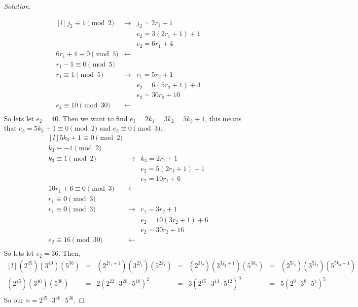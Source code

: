 \documentclass[11pt]{article}
\newenvironment{solution}
  {\renewcommand\qedsymbol{$~$}\begin{proof}[Solution]$ $\par\nobreak\ignorespaces}
  {\end{proof}}
\begin{document}
\begin{solution}
\[\begin{matrix*}[l]
            j_2 \equiv 1 \pmod{2} &\rightarrow & j_2 = 2r_1 + 1 \\
            && e_2 = 3(2r_1+1)+1 \\
            && e_2 = 6r_1 + 4 \\
            6r_1 + 4 \equiv 0 \pmod{5} &\leftarrow& \\
            r_1 - 1 \equiv 0 \pmod{5} && \\
            r_1 \equiv 1 \pmod{5} &\rightarrow& r_1 = 5r_2 + 1 \\
            && e_2 = 6(5r_2 + 1) + 4 \\
            && e_2 = 30r_2 + 10 \\
            e_2 \equiv 10 \pmod{30} &\leftarrow & \\
        \end{matrix*}
    \]
    So lets let $e_2=40$. Then we want to find $e_3 =2k_1 = 3k_2 = 5k_3+1$, this means that $e_3= 5k_3+1 \equiv 0 \pmod{2}$ and $e_3\equiv 0 \pmod{3}$.
    \[
        \begin{matrix*}[l]
            5k_3+1 \equiv 0 \pmod{2} && \\
            k_3 \equiv -1 \pmod{2} && \\
            k_3 \equiv 1 \pmod{2} &\rightarrow & k_3 = 2r_1 + 1 \\
            && e_2 = 5(2r_1+1)+1 \\
            && e_2 = 10r_1 + 6 \\
            10r_1 + 6 \equiv 0 \pmod{3} &\leftarrow& \\
            r_1 \equiv 0 \pmod{3} && \\
            r_1 \equiv 0 \pmod{3} &\rightarrow& r_1 = 3r_2 + 1 \\
            && e_2 = 10(3r_2+1) + 6  \\
            && e_2 = 30r_2 + 16 \\
            e_2 \equiv 16 \pmod{30} &\leftarrow & \\
        \end{matrix*}
    \]
    So lets let $e_2=36$. Then,
    \[
        \begin{matrix*}[l]
            (2^{45})(3^{40})(5^{36}) &=& (2^{2i_1+1})(3^{2j_1})(5^{2k_1})  &=& (2^{3i_2})(3^{3j_2+1})(5^{3k_2}) &=& (2^{5i_3})(3^{5j_3})(5^{5k_3+1}) \\
            (2^{45})(3^{40})(5^{36}) &=& 2(2^{22}\cdot 3^{20}\cdot 5^{18})^2  &=& 3(2^{15}\cdot 3^{13}\cdot 5^{12})^3 &=& 5(2^{9}\cdot 3^{8}\cdot 5^{7})^5 \\
        \end{matrix*}
    \]
    So our $n=2^{45}\cdot 3^{40}\cdot 5^{36}$.
\end{solution}
\end{document}
